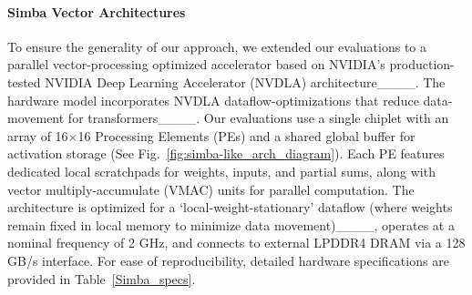
\paragraph{Simba Vector Architectures} %

To ensure the generality of our approach, we extended our evaluations to a parallel vector-processing optimized accelerator based on NVIDIA's production-tested NVIDIA Deep Learning Accelerator (NVDLA) architecture____. The hardware model incorporates NVDLA dataflow-optimizations that reduce data-movement for transformers____. Our evaluations use a single chiplet with an array of 16$\times$16 Processing Elements (PEs) and a shared global buffer for activation storage (See Fig.~\ref{fig:simba-like_arch_diagram}). Each PE features dedicated local scratchpads for weights, inputs, and partial sums, along with vector multiply-accumulate (VMAC) units for parallel computation. The architecture is optimized for a `local-weight-stationary' dataflow (where weights remain fixed in local memory to minimize data movement)____, operates at a nominal frequency of 2 GHz, and connects to external LPDDR4 DRAM via a 128 GB/s interface. For ease of reproducibility, detailed hardware specifications are provided in Table~\ref{Simba_specs}.


